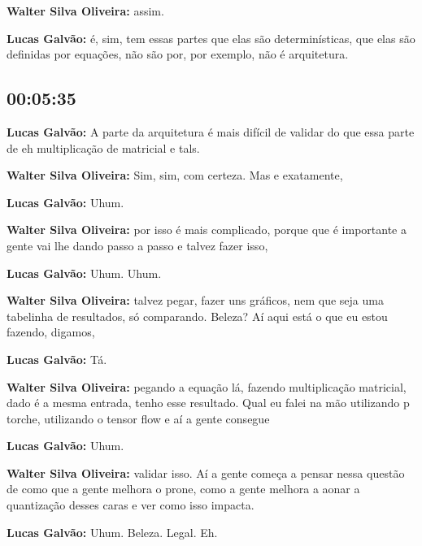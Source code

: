 \textbf{Walter Silva Oliveira:} assim.



\textbf{Lucas Galvão:} é, sim, tem essas partes que elas são determinísticas, que elas são definidas por equações, não são por, por exemplo, não é arquitetura.



\subsection{\textbf{00:05:35}}



\textbf{Lucas Galvão:} A parte da arquitetura é mais difícil de validar do que essa parte de eh multiplicação de matricial e tals.



\textbf{Walter Silva Oliveira:} Sim, sim, com certeza. Mas e exatamente,



\textbf{Lucas Galvão:} Uhum.



\textbf{Walter Silva Oliveira:} por isso é mais complicado, porque que é importante a gente vai lhe dando passo a passo e talvez fazer isso,



\textbf{Lucas Galvão:} Uhum. Uhum.



\textbf{Walter Silva Oliveira:} talvez pegar, fazer uns gráficos, nem que seja uma tabelinha de resultados, só comparando. Beleza? Aí aqui está o que eu estou fazendo, digamos,



\textbf{Lucas Galvão:} Tá.



\textbf{Walter Silva Oliveira:} pegando a equação lá, fazendo multiplicação matricial, dado é a mesma entrada, tenho esse resultado. Qual eu falei na mão utilizando p torche, utilizando o tensor flow e aí a gente consegue



\textbf{Lucas Galvão:} Uhum.



\textbf{Walter Silva Oliveira:} validar isso. Aí a gente começa a pensar nessa questão de como que a gente melhora o prone, como a gente melhora a aonar a quantização desses caras e ver como isso impacta.



\textbf{Lucas Galvão:} Uhum. Beleza. Legal. Eh.



